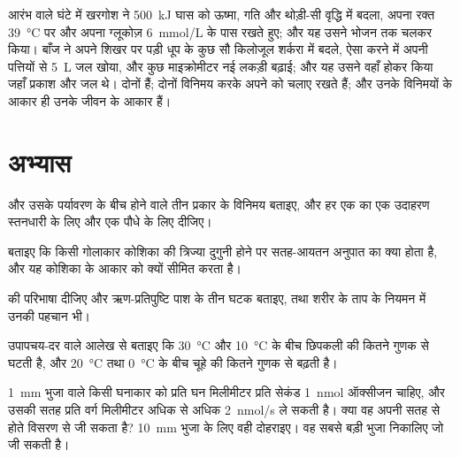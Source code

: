 \begin{example}[वही एक घंटा, दो बहीखाते]\label{ex:b1:organism-environment:budgets}
आरंभ वाले घंटे में खरगोश ने \qty{500}{kJ} घास को ऊष्मा, गति और थोड़ी-सी
वृद्धि में बदला, अपना रक्त \qty{39}{\celsius} पर और अपना ग्लूकोज़
\qty{6}{mmol/L} के पास रखते हुए; और यह उसने भोजन तक चलकर किया। बाँज ने
अपने शिखर पर पड़ी धूप के कुछ सौ किलोजूल शर्करा में बदले, ऐसा करने में
अपनी पत्तियों से \qty{5}{L} जल खोया, और कुछ माइक्रोमीटर नई लकड़ी बढ़ाई;
और यह उसने वहाँ होकर किया जहाँ प्रकाश और जल थे। दोनों  हैं;
दोनों विनिमय करके अपने को चलाए रखते हैं; और उनके विनिमयों के आकार ही
उनके जीवन के आकार हैं।
\end{example}

\section{अभ्यास}

\begin{exercise}[$\star$]\label{exo:b1:organism-environment:1}
 और उसके पर्यावरण के बीच होने वाले तीन प्रकार के विनिमय बताइए, और हर
एक का एक उदाहरण स्तनधारी के लिए और एक पौधे के लिए दीजिए।
\end{exercise}

\begin{exercise}[$\star$]\label{exo:b1:organism-environment:2}
बताइए कि किसी गोलाकार कोशिका की त्रिज्या दुगुनी होने पर सतह-आयतन अनुपात
का क्या होता है, और यह कोशिका के आकार को क्यों सीमित करता है।
\end{exercise}

\begin{exercise}[$\star$]\label{exo:b1:organism-environment:3}
 की परिभाषा दीजिए और ऋण-प्रतिपुष्टि पाश के तीन घटक बताइए, तथा
शरीर के ताप के नियमन में उनकी पहचान भी।
\end{exercise}

\begin{exercise}[$\star$]\label{exo:b1:organism-environment:4}
उपापचय-दर वाले आलेख से बताइए कि \qty{30}{\celsius} और
\qty{10}{\celsius} के बीच छिपकली की  कितने गुणक से घटती है, और
\qty{20}{\celsius} तथा \qty{0}{\celsius} के बीच चूहे की कितने गुणक से
बढ़ती है।
\end{exercise}

\begin{exercise}[$\star\star$]\label{exo:b1:organism-environment:5}
\qty{1}{mm} भुजा वाले किसी घनाकार  को प्रति घन मिलीमीटर प्रति सेकंड
\qty{1}{nmol} ऑक्सीजन चाहिए, और उसकी सतह प्रति वर्ग मिलीमीटर अधिक से अधिक
\qty{2}{nmol/s} ले सकती है। क्या वह अपनी सतह से होते विसरण से जी सकता
है? \qty{10}{mm} भुजा के लिए वही दोहराइए। वह सबसे बड़ी भुजा निकालिए जो
जी सकती है।
\end{exercise}

